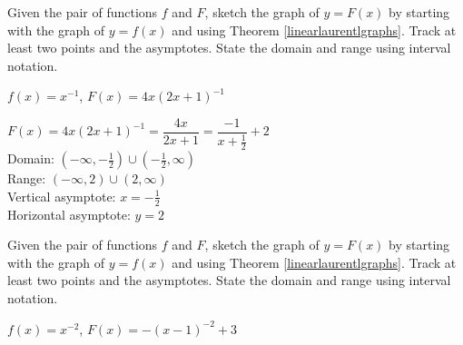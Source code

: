 \documentclass{ximera}
\begin{document}
\begin{problem}
Given the pair of functions $f$ and $F$, sketch the graph of $y=F(x)$ by starting with the graph of $y = f(x)$ and using Theorem \ref{linearlaurentlgraphs}.  Track at least two points and the asymptotes.  State the domain and range using interval notation.

$f(x) =x^{-1}$, $F(x)=4x(2x+1)^{-1}$

\begin{solution}
$F(x)=4x(2x+1)^{-1} = \dfrac{4x}{2x+1} = \dfrac{-1}{x+\frac{1}{2}}+2$ \\
Domain: $\left(-\infty, -\frac{1}{2} \right) \cup \left(-\frac{1}{2},  \infty \right)$ \\
Range: $(-\infty, 2) \cup (2, \infty)$ \\
Vertical asymptote:  $x  = -\frac{1}{2}$ \\
Horizontal asymptote: $y= 2$\\

\end{solution}
\end{problem} 

\begin{problem}\label{rationaltranslast}
Given the pair of functions $f$ and $F$, sketch the graph of $y=F(x)$ by starting with the graph of $y = f(x)$ and using Theorem \ref{linearlaurentlgraphs}.  Track at least two points and the asymptotes.  State the domain and range using interval notation.

$f(x) = x^{-2}$, $F(x)=-(x-1)^{-2}+3$ 
\end{problem}   
\end{document}
